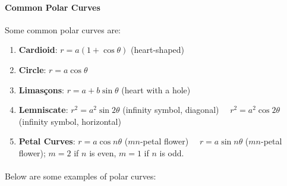 \documentclass[11pt]{article}
\begin{document}
\paragraph{Common Polar Curves} Some common polar curves are:
\begin{enumerate}
    \item \textbf{Cardioid}: $r = a(1 + \cos \theta)$ (heart-shaped)
    \item \textbf{Circle}: $r = a\cos \theta$ 
    \item \textbf{Limasçons}: $r = a + b\sin \theta$ (heart with a hole)
    \item \textbf{Lemniscate}: $r^2 = a^2\sin 2\theta$ (infinity symbol, diagonal) \vspace{1em} $\quad r^2 = a^2\cos 2\theta$ (infinity symbol, horizontal)
    \item \textbf{Petal Curves}: $r = a\cos n\theta$ ($mn$-petal flower) \vspace{1em} $\quad r = a\sin n\theta$ ($mn$-petal flower); $m=2$ if $n$ is even, $m=1$ if $n$ is odd.
\end{enumerate}
\paragraph{} Below are some examples of polar curves:
\begin{figure}[h!]
    \centering
    \begin{minipage}{0.48\textwidth}
        \centering
    \end{minipage}
    \hfill
    \begin{minipage}{0.48\textwidth}
        \centering
    \end{minipage}
\end{figure}
\end{document}
